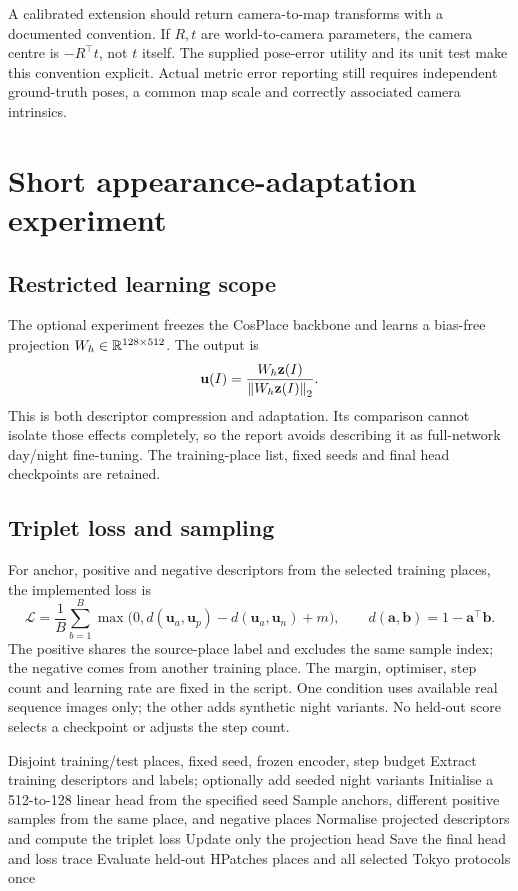 A calibrated extension should return camera-to-map transforms with a documented convention. If $R,t$ are world-to-camera parameters, the camera centre is $-R^\top t$, not $t$ itself. The supplied pose-error utility and its unit test make this convention explicit. Actual metric error reporting still requires independent ground-truth poses, a common map scale and correctly associated camera intrinsics.
\fi

\section{Short appearance-adaptation experiment}
\subsection{Restricted learning scope}
The optional experiment freezes the CosPlace backbone and learns a bias-free projection $W_h\in\mathbb{R}^{128\times512}$. The output is
\begin{equation}
 \mathbf u(I)=\frac{W_h\mathbf z(I)}{\left\lVert W_h\mathbf z(I)\right\rVert_2}.
\end{equation}
This is both descriptor compression and adaptation. Its comparison cannot isolate those effects completely, so the report avoids describing it as full-network day/night fine-tuning. The training-place list, fixed seeds and final head checkpoints are retained.

\subsection{Triplet loss and sampling}
For anchor, positive and negative descriptors from the selected training places, the implemented loss is
\begin{equation}
 \mathcal L=\frac1B\sum_{b=1}^{B}
 \max\bigl(0,d(\mathbf u_a,\mathbf u_p)-d(\mathbf u_a,\mathbf u_n)+m\bigr),
 \qquad d(\mathbf a,\mathbf b)=1-\mathbf a^\top\mathbf b.
\end{equation}
The positive shares the source-place label and excludes the same sample index; the negative comes from another training place. The margin, optimiser, step count and learning rate are fixed in the script. One condition uses available real sequence images only; the other adds synthetic night variants. No held-out score selects a checkpoint or adjusts the step count.

\begin{algorithm}[htbp]
\caption{Frozen-descriptor projection training}\label{alg:training}
\begin{algorithmic}[1]
\Require Disjoint training/test places, fixed seed, frozen encoder, step budget
\State Extract training descriptors and labels; optionally add seeded night variants
\State Initialise a 512-to-128 linear head from the specified seed
\State Sample anchors, different positive samples from the same place, and negative places
\State Normalise projected descriptors and compute the triplet loss
\State Update only the projection head
\EndFor
\State Save the final head and loss trace
\State Evaluate held-out HPatches places and all selected Tokyo protocols once
\end{algorithmic}
\end{algorithm}

